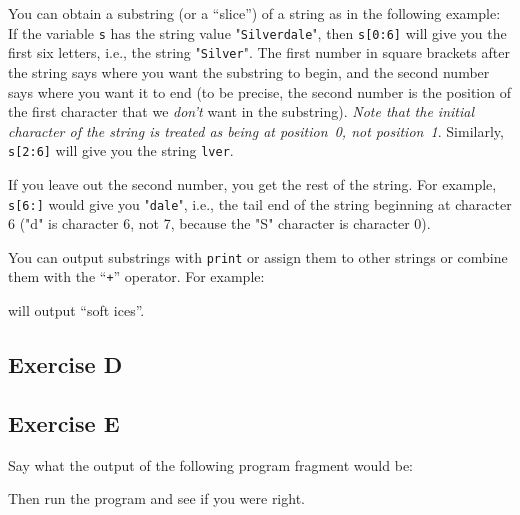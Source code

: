You can obtain a substring (or a ``slice'')
of a string as in the %
following example:
If the variable \verb!s! has the string value "\verb!Silverdale!", then
\verb!s[0:6]! will give you the first six letters, i.e., the string
"\verb!Silver!".  The first number in square brackets
after the string
says where you want the substring to begin, and the second number says
where you want it to end (to be precise, the second number is the
position of the first character that we \emph{don't} want in the
substring). \emph{Note that the initial character of the string
is treated as being at position~0, not position~1}.
Similarly, \verb!s[2:6]! will give you the string \verb!lver!.

If you leave out the second number, you get the rest of the string.
For example, \verb!s[6:]! would give you "\verb!dale!", i.e., the
tail end of the string beginning at character 6 ("d" is character 6,
not 7, because the "S" character is character 0).

You can output substrings with \verb!print! or assign them to other
strings or combine them with the ``\texttt{+}'' operator.  For example:


will output ``soft ices''.

\subsection*{Exercise D}


\subsection*{Exercise E}

Say what the output of the following program fragment would be:


Then run the program and see if you were right. 



